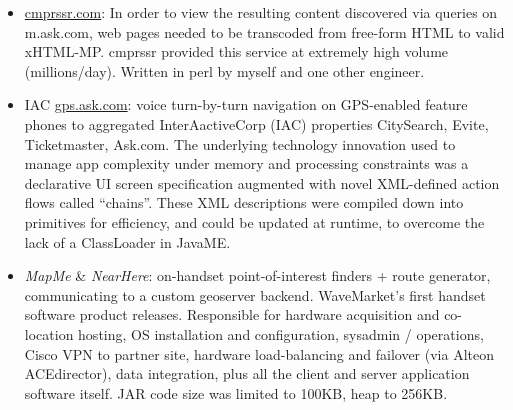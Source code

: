 \begin{itemize}
		\item \url{cmprssr.com}: In order to view the resulting content discovered via queries on m.ask.com, web 
		pages needed to be transcoded from free-form HTML to valid xHTML-MP. cmprssr provided this service at
		extremely high volume (millions/day). Written in perl by myself and one other engineer.

  		\item IAC \url{gps.ask.com}: voice turn-by-turn navigation on GPS-enabled feature phones
		 to aggregated InterAactiveCorp (IAC) properties CitySearch, Evite, Ticketmaster, Ask.com. The underlying technology innovation
		  used to manage app complexity under memory and processing constraints was a declarative UI screen specification
		   augmented with novel XML-defined action flows called “chains”. These XML descriptions were compiled down
		    into primitives for efficiency, and could be updated at runtime, to overcome the lack of a ClassLoader 
		    in JavaME. 
	   
  		\item {\em MapMe} \& {\em NearHere}:
		on-handset point-of-interest finders + route generator, communicating to a custom geoserver
		backend. WaveMarket’s first handset software product releases. Responsible for hardware acquisition
		and co-location hosting,
		OS installation and configuration, sysadmin / operations, Cisco VPN to partner site, hardware load-balancing
		and failover (via Alteon ACEdirector), data integration, plus all the client and server application software itself.
		JAR code size was limited to 100KB, heap to 256KB.
		
	\end{itemize}


